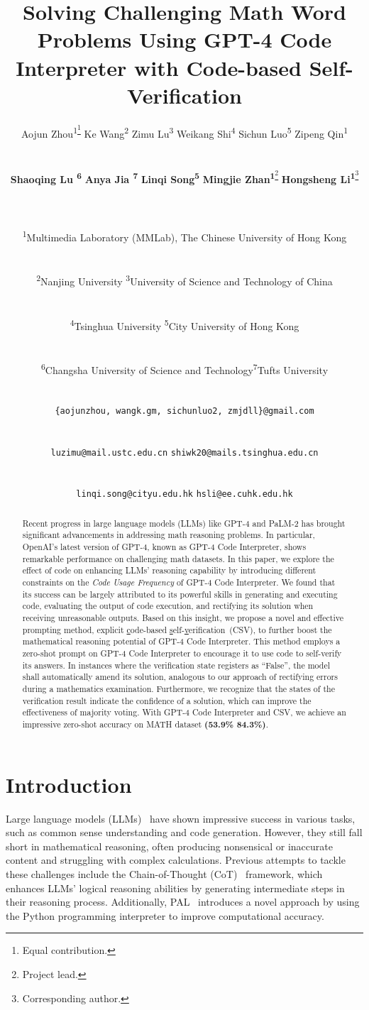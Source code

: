 \documentclass{article} \usepackage{iclr2023_conference,times}
\title{Solving Challenging Math Word Problems Using GPT-4 Code Interpreter with Code-based Self-Verification}
\author{\centerline{Aojun Zhou\textsuperscript{1}\textsuperscript{\thanks{Equal contribution.}}
\quad Ke Wang\textsuperscript{2}\textsuperscript{\blfootnote{Equal contribution.}} 
\quad Zimu Lu\textsuperscript{3}\textsuperscript{\blfootnote{Equal contribution.}} 
\quad Weikang Shi\textsuperscript{4}\textsuperscript{\blfootnote{Equal contribution.}} 
\quad Sichun Luo\textsuperscript{5}\textsuperscript{\blfootnote{Equal contribution.}}  
\quad Zipeng Qin\textsuperscript{1}} \\ 
\centerline{\textbf{Shaoqing Lu \textsuperscript{6}} 
\quad \textbf{Anya Jia \textsuperscript{7}} 
\quad \textbf{Linqi Song\textsuperscript{5}} 
\quad \textbf{Mingjie Zhan\textsuperscript{1}}\textsuperscript{\normalsize \thanks{Project lead.}} 
\quad \textbf{Hongsheng Li\textsuperscript{1}}\textsuperscript{\normalsize \thanks{Corresponding author.}}} \\\\
\centerline{\textsuperscript{1}Multimedia Laboratory (MMLab), The Chinese University of Hong Kong} \\
\centerline{\textsuperscript{2}Nanjing University \quad  \textsuperscript{3}University of Science and Technology of China} \\
\centerline{\textsuperscript{4}Tsinghua University  \quad \textsuperscript{5}City University of Hong Kong} \\ 
\centerline{\textsuperscript{6}Changsha University of Science and Technology\quad\textsuperscript{7}Tufts University} \\
\centerline{\texttt{\{aojunzhou, wangk.gm, sichunluo2, zmjdll\}@gmail.com}} \\ 
\centerline{\texttt{luzimu@mail.ustc.edu.cn} \quad \texttt{shiwk20@mails.tsinghua.edu.cn}}\\
\centerline{\texttt{linqi.song@cityu.edu.hk} \quad \texttt{hsli@ee.cuhk.edu.hk}}
}
\begin{document}
\maketitle



\begin{abstract}


Recent progress in large language models (LLMs) like GPT-4 and PaLM-2 has brought significant advancements in addressing math reasoning problems. In particular, OpenAI's latest version of GPT-4, known as GPT-4 Code Interpreter, shows remarkable performance on challenging math datasets. In this paper, we explore the effect of code on enhancing LLMs' reasoning capability by introducing different constraints on the \textit{Code Usage Frequency} of GPT-4 Code Interpreter. We found that its success can be largely attributed to its powerful skills in generating and executing code, evaluating the output of code execution, and rectifying its solution when receiving unreasonable outputs. Based on this insight, we propose a novel and effective prompting method, explicit \uline{c}ode-based \uline{s}elf-\uline{v}erification~(CSV), to further boost the mathematical reasoning potential of GPT-4 Code Interpreter. This method employs a zero-shot prompt on GPT-4 Code Interpreter to encourage it to use code to self-verify its answers. In instances where the verification state registers as ``False'', the model shall automatically amend its solution, analogous to our approach of rectifying errors during a mathematics examination. Furthermore, we recognize that the states of the verification result indicate the confidence of a solution, which can improve the effectiveness of majority voting. With GPT-4 Code Interpreter and CSV, we achieve an impressive zero-shot accuracy on MATH dataset \textbf{(53.9\%  84.3\%)}. 




\end{abstract}
\section{Introduction}

Large language models (LLMs)~\citep{brown2020language, openai2023gpt4, anil2023palm} have shown impressive success in various tasks, such as common sense understanding and code generation. However, they still fall short in mathematical reasoning, often producing nonsensical or inaccurate content and struggling with complex calculations. Previous attempts to tackle these challenges include the Chain-of-Thought (CoT)~\citep{wei2022chain} framework,  which enhances LLMs' logical reasoning abilities by generating intermediate steps in their reasoning process. Additionally, PAL~\citep{gao2023pal} introduces a novel approach by using the Python programming interpreter to improve computational accuracy.
\end{document}
